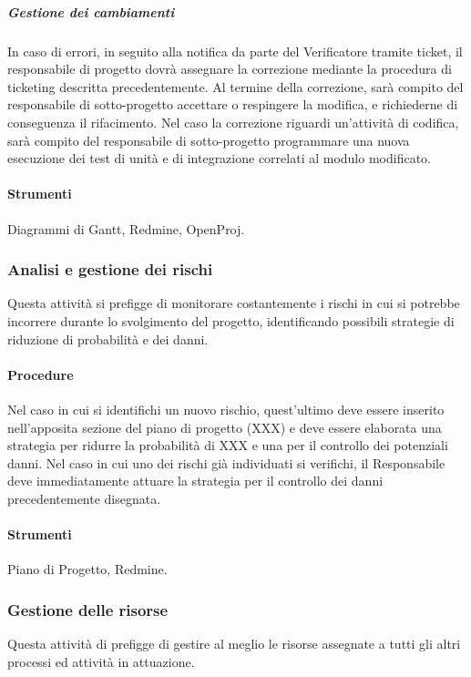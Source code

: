 \subparagraph{Gestione dei cambiamenti}

In caso di errori, in seguito alla notifica da parte del Verificatore tramite ticket, il responsabile di progetto dovrà assegnare la correzione mediante la procedura di
ticketing descritta precedentemente.
Al termine della correzione, sarà compito del responsabile di sotto-progetto accettare o respingere la modifica, e richiederne di conseguenza il rifacimento.
Nel caso la correzione riguardi un’attività di codifica, sarà compito del responsabile di sotto-progetto programmare una nuova esecuzione dei test di unità e di integrazione correlati al modulo modificato.



\paragraph{Strumenti}
Diagrammi di Gantt, Redmine, OpenProj.


\subsubsection{Analisi e gestione dei rischi}

Questa attività si prefigge di monitorare costantemente i rischi in cui si potrebbe incorrere durante lo svolgimento del progetto, identificando possibili strategie di riduzione di probabilità e dei danni. 


\paragraph{Procedure}
Nel caso in cui si identifichi un nuovo rischio, quest'ultimo deve essere inserito nell'apposita sezione del piano di progetto (XXX) e deve essere elaborata una strategia per ridurre la probabilità di XXX e una per il controllo dei potenziali danni.
Nel caso in cui uno dei rischi già individuati si verifichi, il Responsabile deve immediatamente attuare la strategia per il controllo dei danni precedentemente disegnata.

\paragraph{Strumenti}
Piano di Progetto, Redmine.


\subsubsection{Gestione delle risorse}
Questa attività di prefigge di gestire al meglio le risorse assegnate a tutti gli altri processi ed attività in attuazione.
